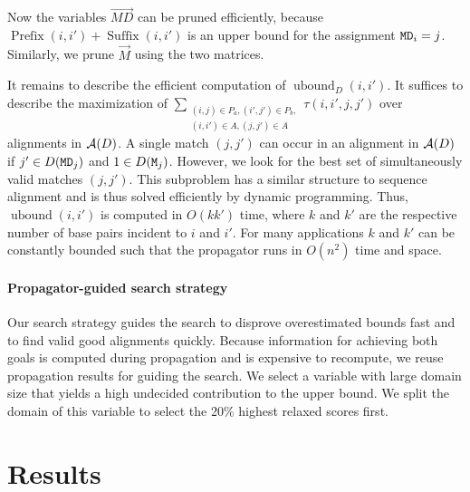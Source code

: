 \documentclass[11pt]{llncs}
\begin{document}
Now the variables $\vec{MD}$ can be pruned efficiently, because
$\operatorname{Prefix}{(i,i')}+\operatorname{Suffix}{(i,i')}$ is an
upper bound for the assignment $\texttt{MD}_i=j$. Similarly, we prune
$\vec{M}$ using the two matrices.

It remains to describe the efficient computation of
$\operatorname{ubound}_D(i,i')$. It suffices to describe the
maximization of $\sum_{\substack{(i,j)\in P_a,(i',j')\in
    P_b,\\(i,i')\in A,(j,j')\in A}} \tau(i,i',j,j')$ over alignments
in ${\mathcal A}(D)$. A single match $(j,j')$ can occur in an alignment in
${\mathcal A}(D)$ if $j'\in D(\texttt{MD}_j)$ and $1\in D(\texttt{M}_j)$. However, we
look for the best set of simultaneously valid matches $(j,j')$. This
subproblem has a similar structure to sequence alignment and is thus
solved efficiently by dynamic programming. Thus,
$\operatorname{ubound}(i,i')$ is computed in $O(kk')$ time, where $k$
and $k'$ are the respective number of base pairs incident to $i$ and
$i'$. For many applications $k$ and $k'$ can be constantly bounded
such that the propagator runs in $O(n^2)$ time and space.

\paragraph{Propagator-guided search strategy}
Our search strategy guides the search to disprove overestimated bounds
fast and to find valid good alignments quickly. Because information
for achieving both goals is computed during propagation and is
expensive to recompute, we reuse propagation results for guiding the
search. We select a variable with large domain size that yields a high
undecided contribution to the upper bound. We split the domain of this
variable to select the 20\% highest relaxed scores first.




\section{Results}
\end{document}
